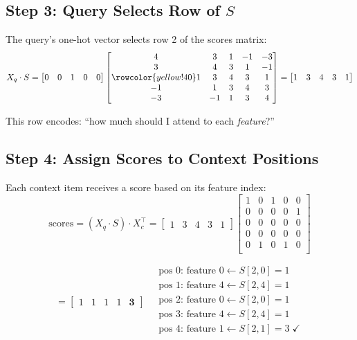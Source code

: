 \documentclass[12pt]{article}
\begin{document}
\subsection*{Step 3: Query Selects Row of $S$}

The query's one-hot vector selects row 2 of the scores matrix:
\[
X_q \cdot S = \begin{bmatrix} 0 & 0 & 1 & 0 & 0 \end{bmatrix}
\begin{bmatrix}
 4 &  3 &  1 & -1 & -3 \\
 3 &  4 &  3 &  1 & -1 \\
 \rowcolor{yellow!40} 1 &  3 &  4 &  3 &  1 \\
-1 &  1 &  3 &  4 &  3 \\
-3 & -1 &  1 &  3 &  4 \\
\end{bmatrix}
= \begin{bmatrix} 1 & 3 & 4 & 3 & 1 \end{bmatrix}
\]

This row encodes: ``how much should I attend to each \emph{feature}?''

\subsection*{Step 4: Assign Scores to Context Positions}

Each context item receives a score based on its feature index:
\[
\text{scores} = (X_q \cdot S) \cdot X_c^\top = \begin{bmatrix} 1 & 3 & 4 & 3 & 1 \end{bmatrix}
\begin{bmatrix}
1 & 0 & 1 & 0 & 0 \\
0 & 0 & 0 & 0 & 1 \\
0 & 0 & 0 & 0 & 0 \\
0 & 0 & 0 & 0 & 0 \\
0 & 1 & 0 & 1 & 0 \\
\end{bmatrix}
\]

\[
= \begin{bmatrix} 1 & 1 & 1 & 1 & \mathbf{3} \end{bmatrix}
\quad
\begin{array}{l}
\text{pos 0: feature 0} \leftarrow S[2,0] = 1 \\
\text{pos 1: feature 4} \leftarrow S[2,4] = 1 \\
\text{pos 2: feature 0} \leftarrow S[2,0] = 1 \\
\text{pos 3: feature 4} \leftarrow S[2,4] = 1 \\
\text{pos 4: feature 1} \leftarrow S[2,1] = 3 \; \checkmark \\
\end{array}
\]
\end{document}
